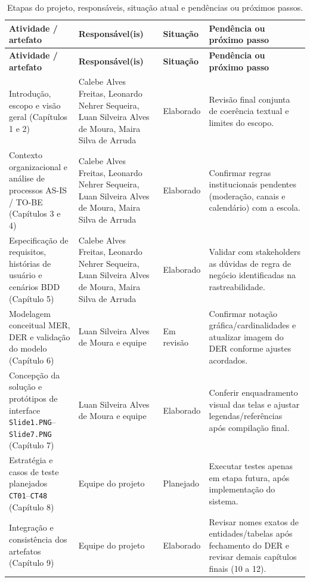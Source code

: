 \documentclass[a4paper,12pt]{report}
\begin{document}
\begin{longtable}{|p{3.6cm}|p{3.4cm}|p{2.4cm}|p{5.2cm}|}
\caption{Etapas do projeto, responsáveis, situação atual e pendências ou próximos passos.} \label{tab:etapas-situacao} \\
\hline
\textbf{Atividade / artefato} & \textbf{Responsável(is)} & \textbf{Situação} & \textbf{Pendência ou próximo passo} \\
\hline
\endfirsthead
\hline
\textbf{Atividade / artefato} & \textbf{Responsável(is)} & \textbf{Situação} & \textbf{Pendência ou próximo passo} \\
\hline
\endhead
Introdução, escopo e visão geral (Capítulos 1 e 2) & Calebe Alves Freitas, Leonardo Nehrer Sequeira, Luan Silveira Alves de Moura, Maira Silva de Arruda & Elaborado & Revisão final conjunta de coerência textual e limites do escopo. \\
\hline
Contexto organizacional e análise de processos AS-IS / TO-BE (Capítulos 3 e 4) & Calebe Alves Freitas, Leonardo Nehrer Sequeira, Luan Silveira Alves de Moura, Maira Silva de Arruda & Elaborado & Confirmar regras institucionais pendentes (moderação, canais e calendário) com a escola. \\
\hline
Especificação de requisitos, histórias de usuário e cenários BDD (Capítulo 5) & Calebe Alves Freitas, Leonardo Nehrer Sequeira, Luan Silveira Alves de Moura, Maira Silva de Arruda & Elaborado & Validar com stakeholders as dúvidas de regra de negócio identificadas na rastreabilidade. \\
\hline
Modelagem conceitual MER, DER e validação do modelo (Capítulo 6) & Luan Silveira Alves de Moura e equipe & Em revisão & Confirmar notação gráfica/cardinalidades e atualizar imagem do DER conforme ajustes acordados. \\
\hline
Concepção da solução e protótipos de interface \texttt{Slide1.PNG}--\texttt{Slide7.PNG} (Capítulo 7) & Luan Silveira Alves de Moura e equipe & Elaborado & Conferir enquadramento visual das telas e ajustar legendas/referências após compilação final. \\
\hline
Estratégia e casos de teste planejados \texttt{CT01}--\texttt{CT48} (Capítulo 8) & Equipe do projeto & Planejado & Executar testes apenas em etapa futura, após implementação do sistema. \\
\hline
Integração e consistência dos artefatos (Capítulo 9) & Equipe do projeto & Elaborado & Revisar nomes exatos de entidades/tabelas após fechamento do DER e revisar demais capítulos finais (10 a 12). \\
\hline
\end{longtable}
\end{document}
